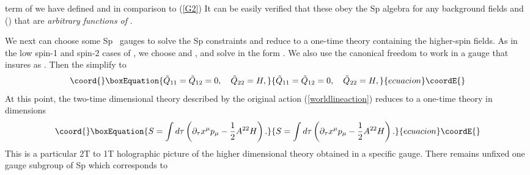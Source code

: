 \documentclass[a4paper,12pt]{article}
\begin{document}
\coordHE{} term of \coordHE{} we have defined \coordHE{}
and \coordHE{} in comparison to (\ref{G2})\coordHE{} It can be
easily verified that these \coordHE{} obey the Sp\coordHE{} algebra for
any background fields \coordHE{} and \coordHE{} (\coordHE{}) that are \textit{arbitrary functions
of} \coordHE{}.

We next can choose some Sp\coordHE{} \ gauges to solve the Sp\coordHE{} constraints \coordHE{} and reduce to a one-time theory containing
the higher-spin fields. As in the low spin-1 and spin-2 cases of \cite
{emgrav}, we choose \coordHE{} and \coordHE{}, and solve \coordHE{} in the form \coordHE{}. We also use the
canonical freedom \coordHE{} to work in a gauge that insures \coordHE{} as \coordHE{}. Then the \coordHE{} simplify to
\begin{equation}\coord{}\boxEquation{
\tilde{Q}_{11}=\tilde{Q}_{12}=0,\quad \tilde{Q}_{22}=H,
}{
\tilde{Q}_{11}=\tilde{Q}_{12}=0,\quad \tilde{Q}_{22}=H,
}{ecuacion}\coordE{}\end{equation}
At this point, the two-time \coordHE{} dimensional theory described by the
original action (\ref{worldlineaction}) reduces to a one-time theory in \coordHE{}
dimensions
\begin{equation}\coord{}\boxEquation{
S=\int d\tau \left( \partial _{\tau }x^{\mu }p_{\mu }-\frac{1}{2}
A^{22}H\right) .  \label{actiond}
}{
S=\int d\tau \left( \partial _{\tau }x^{\mu }p_{\mu }-\frac{1}{2}
A^{22}H\right) .  }{ecuacion}\coordE{}\end{equation}
This is a particular 2T to 1T holographic picture of the higher dimensional
theory obtained in a specific gauge. There remains unfixed one gauge
subgroup of Sp\coordHE{} which corresponds to \myHighlight{$\tau $}\coordHE{}
\end{document}
